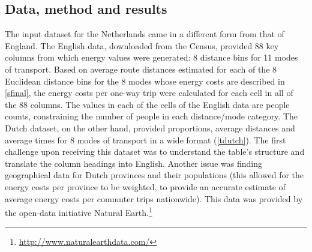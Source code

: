 \subsection{Data, method and results} \label{sdutchdata}
The input dataset for the Netherlands came in a different form from
that of England. The English data, downloaded from the Census,
provided 88 key columns from which energy values were generated:
8 distance bins for 11 modes of transport. Based on average route distances
estimated for each of the 8 Euclidean distance bins for the 8 modes whose
energy costs are described in \cref{sfinal}, the energy costs per one-way
trip were calculated for each cell in all of the 88 columns. The values in
each of the cells of the English data are people counts, constraining the
number of people in each distance/mode category.
The Dutch dataset, on the other hand, provided proportions, average distances
and average times for 8 modes of transport in a wide format (\cref{tdutch}).
The first challenge upon receiving this dataset was to understand the
table's structure and translate the column headings into English.
Another issue was finding geographical data for Dutch provinces and their
populations (this allowed for the energy costs per province to be weighted,
to provide an accurate estimate of average energy costs per commuter trips
nationwide). This data was provided by the open-data initiative
Natural Earth.\footnote{\href{http://www.naturalearthdata.com/}
{http://www.naturalearthdata.com/}
}

